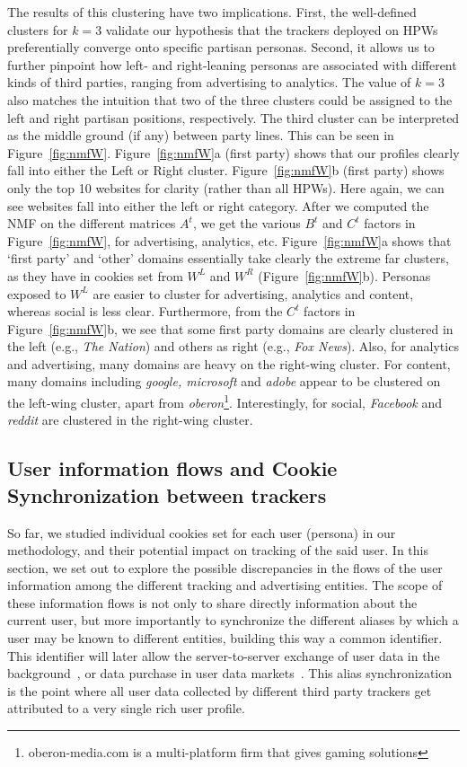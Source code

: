 \documentclass{article}
\newcommand{\hpws}{HPWs\xspace}
\begin{document}
The results of this clustering have two implications.
First, the well-defined clusters for $k=3$ validate our hypothesis that the trackers deployed on \hpws preferentially converge onto specific partisan personas.
Second, it allows us to further pinpoint how left- and right-leaning personas are associated with different kinds of third parties, ranging from advertising to analytics. 
The value of $k=3$ also matches the intuition that two of the three clusters could be assigned to the left and right partisan positions, respectively.
The third cluster can be interpreted as the middle ground (if any) between party lines.
This can be seen in Figure~\ref{fig:nmfW}.
Figure~\ref{fig:nmfW}a (first party) shows that our profiles clearly fall into either the Left or Right cluster.
Figure~\ref{fig:nmfW}b (first party) shows only the top 10 websites for clarity (rather than all \hpws).
Here again, we can see websites fall into either the left or right category. 
After we computed the NMF on the different matrices $A^t$, we get the various $B^t$ and $C^t$ factors in Figure~\ref{fig:nmfW}, for advertising, analytics, etc.
Figure~\ref{fig:nmfW}a shows that `first party' and `other' domains essentially take clearly the extreme far clusters, as they have in cookies set from $W^L$ and $W^R$ (Figure~\ref{fig:nmfW}b).
Personas exposed to $W^L$ are easier to cluster for advertising, analytics and content, whereas social is less clear.
Furthermore, from the $C^t$ factors in Figure~\ref{fig:nmfW}b, we see that some first party domains are clearly clustered in the left (e.g., \emph{The Nation}) and others as right (e.g., \emph{Fox News}).
Also, for analytics and advertising, many domains are heavy on the right-wing cluster.
For content, many domains including \emph{google, microsoft} and \emph{adobe} appear to be clustered on the left-wing cluster, apart from \emph{oberon}\footnote{oberon-media.com is a multi-platform firm that gives gaming solutions}.
Interestingly, for social, \emph{Facebook} and \emph{reddit} are clustered in the right-wing cluster.



\subsection{User information flows and Cookie Synchronization between trackers}\label{sec:cs}

So far, we studied individual cookies set for each user (persona) in our methodology, and their potential impact on tracking of the said user.
In this section, we set out to explore the possible discrepancies in the flows of the user information among the different tracking and advertising entities.
The scope of these information flows is not only to share directly information about the current user, but more importantly to synchronize the different aliases by which a user may be known to different entities, building this way a common identifier.
This identifier will later allow the server-to-server exchange of user data in the background~\cite{acar2014web}, or data purchase in user data markets~\cite{Spiekermann2015, elmeleegy2013overview}.
This alias synchronization is the point where all user data collected by different third party trackers get attributed to a very single rich user profile.
\end{document}
